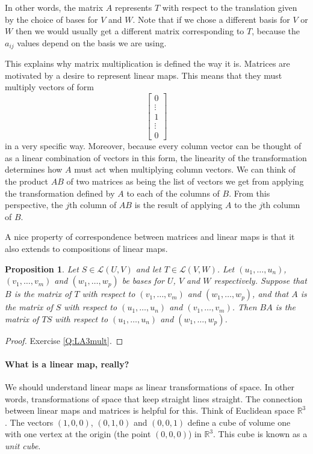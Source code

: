 \documentclass{article}
\theoremstyle{plain}
\newtheorem{proposition}[theorem]{Proposition}{\bfseries}{\itshape}
\newcommand{\bR}{\mathbb{R}}
\newcommand{\cL}{\mathcal{L}}
\begin{document}
 
In other words, the matrix $A$ represents $T$ with respect to the translation given by the choice of bases for $V$ and $W$. Note that if we chose a different basis for $V$ or $W$ then we would usually get a different matrix corresponding to $T$, because the $a_{ij}$ values depend on the basis we are using.

This explains why matrix multiplication is defined the way it is. Matrices are motivated by a desire to represent linear maps. This means that they must multiply vectors of form 
\[\begin{bmatrix}
0\\
\vdots\\
1\\
\vdots\\
0
\end{bmatrix}\]
in a very specific way. Moreover, because every column vector can be thought of as a linear combination of vectors in this form, the linearity of the transformation determines how $A$ must act when multiplying column vectors. We can think of the product $AB$ of two matrices as being the list of vectors we get from applying the transformation defined by $A$ to each of the columns of $B$. From this perspective, the $j$th column of $AB$ is the result of applying $A$ to the $j$th column of $B$.

A nice property of correspondence between matrices and linear maps is that it also extends to compositions of linear maps.

\begin{proposition}\label{P:LA3mult}
Let $S\in \cL(U,V)$ and let $T\in\cL(V,W)$. Let $(u_1,\ldots,u_n)$, $(v_1,\ldots,v_m)$ and $(w_1,\ldots, w_p)$ be bases for $U$, $V$ and $W$ respectively. Suppose that $B$ is the matrix of $T$ with respect to $(v_1,\ldots,v_m)$ and $(w_1,\ldots, w_p)$, and that $A$ is the matrix of $S$ with respect to $(u_1,\ldots,u_n)$ and $(v_1,\ldots,v_m)$. Then $BA$ is the matrix of $TS$ with respect to $(u_1,\ldots,u_n)$ and $(w_1,\ldots, w_p)$.
\end{proposition}  
\begin{proof}
Exercise \ref{Q:LA3mult}. 
\end{proof}

\paragraph{What is a linear map, really?}
We should understand linear maps as linear transformations of space. In other words, transformations of space that keep straight lines straight. The connection between linear maps and matrices is helpful for this. Think of Euclidean space $\bR^3$. The vectors $(1,0,0)$, $(0,1,0)$ and $(0,0,1)$ define a cube of volume one with one vertex at the origin (the point $(0,0,0)$) in $\bR^3$. This cube is known as a \emph{unit cube}. 
\end{document}
